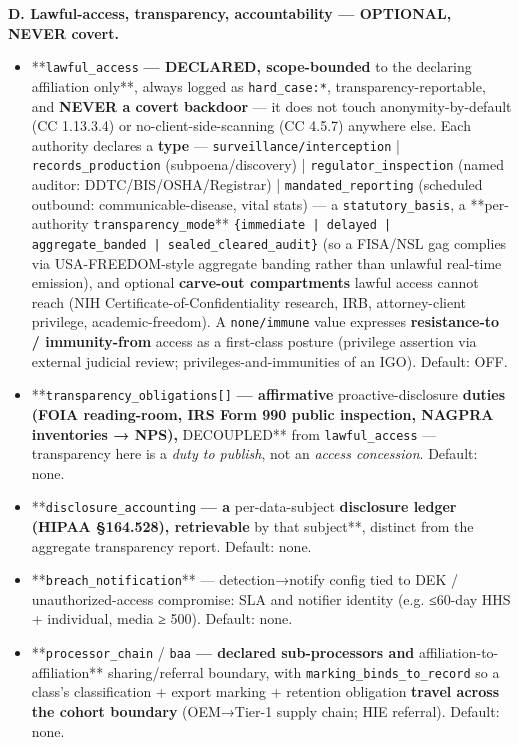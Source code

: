 \documentclass[11pt]{article}
\begin{document}
\textbf{D. Lawful-access, transparency, accountability — OPTIONAL, NEVER covert.}


\begin{itemize}\setlength\itemsep{0pt}
\item **\texttt{lawful\_access}\textbf{ — DECLARED, scope-bounded }to the declaring affiliation only**, always logged as \texttt{hard\_case:*}, transparency-reportable, and \textbf{NEVER a covert backdoor} — it does not touch anonymity-by-default (CC 1.13.3.4) or no-client-side-scanning (CC 4.5.7) anywhere else. Each authority declares a \textbf{type} — \texttt{surveillance/interception} | \texttt{records\_production} (subpoena/discovery) | \texttt{regulator\_inspection} (named auditor: DDTC/BIS/OSHA/Registrar) | \texttt{mandated\_reporting} (scheduled outbound: communicable-disease, vital stats) — a \texttt{statutory\_basis}, a **per-authority \texttt{transparency\_mode}** \texttt{\{immediate | delayed | aggregate\_banded | sealed\_cleared\_audit\}} (so a FISA/NSL gag complies via USA-FREEDOM-style aggregate banding rather than unlawful real-time emission), and optional \textbf{carve-out compartments} lawful access cannot reach (NIH Certificate-of-Confidentiality research, IRB, attorney-client privilege, academic-freedom). A \texttt{none/immune} value expresses \textbf{resistance-to / immunity-from} access as a first-class posture (privilege assertion via external judicial review; privileges-and-immunities of an IGO). Default: OFF.
\item **\texttt{transparency\_obligations[]}\textbf{ — affirmative }proactive-disclosure\textbf{ duties (FOIA reading-room, IRS Form 990 public inspection, NAGPRA inventories → NPS), }DECOUPLED** from \texttt{lawful\_access} — transparency here is a \textit{duty to publish}, not an \textit{access concession}. Default: none.
\item **\texttt{disclosure\_accounting}\textbf{ — a }per-data-subject\textbf{ disclosure ledger (HIPAA §164.528), retrievable }by that subject**, distinct from the aggregate transparency report. Default: none.
\item **\texttt{breach\_notification}** — detection→notify config tied to DEK / unauthorized-access compromise: SLA and notifier identity (e.g. ≤60-day HHS + individual, media ≥ 500). Default: none.
\item **\texttt{processor\_chain} / \texttt{baa}\textbf{ — declared sub-processors and }affiliation-to-affiliation** sharing/referral boundary, with \texttt{marking\_binds\_to\_record} so a class's classification + export marking + retention obligation \textbf{travel across the cohort boundary} (OEM→Tier-1 supply chain; HIE referral). Default: none.
\end{itemize}
\end{document}
